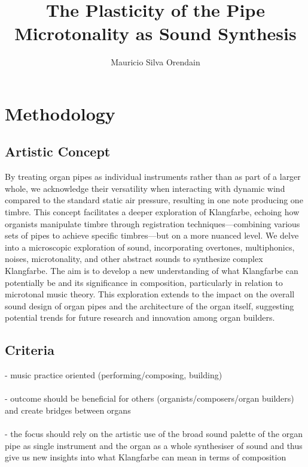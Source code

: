 \documentclass[11pt, oneside]{report}   	%
\title{%
 The Plasticity of the Pipe \\
  \large Microtonality as Sound Synthesis \\
    }
\author{Mauricio Silva Orendain}
\begin{document}
\maketitle

\chapter*{Methodology}

\section{Artistic Concept}

By treating organ pipes as individual instruments rather than as part of a larger whole, we acknowledge their versatility when interacting with dynamic wind compared to the standard static air pressure, resulting in one note producing one timbre. This concept facilitates a deeper exploration of Klangfarbe, echoing how organists manipulate timbre through registration techniques—combining various sets of pipes to achieve specific timbres—but on a more nuanced level. We delve into a microscopic exploration of sound, incorporating overtones, multiphonics, noises, microtonality, and other abstract sounds to synthesize complex Klangfarbe. The aim is to develop a new understanding of what Klangfarbe can potentially be and its significance in composition, particularly in relation to microtonal music theory. This exploration extends to the impact on the overall sound design of organ pipes and the architecture of the organ itself, suggesting potential trends for future research and innovation among organ builders.

\section{Criteria}

- music practice oriented (performing/composing, building)\\
\\
- outcome should be beneficial for others (organists/composers/organ builders) and create bridges between organs\\
\\
- the focus should rely on the artistic use of the broad sound palette of the organ pipe as single instrument and the organ as a whole synthesiser of sound and thus give us new insights into what Klangfarbe can mean in terms of composition \\
\end{document}
